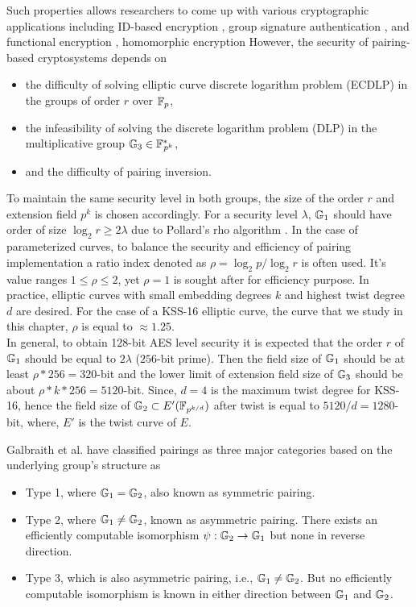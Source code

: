 Such properties allows researchers to come up with various cryptographic applications including ID-based encryption \cite{C:BonFra01}, group signature authentication \cite{C:BonBoySha04}, and functional encryption \cite{C:OkaTak10}, homomorphic encryption \cite{EC:OkaUch98a,CCS:NacSte98,PAIRING:OkaTak08} However, the security of pairing-based cryptosystems depends  on 
\begin{itemize}
	\item  the difficulty of solving elliptic curve discrete logarithm problem (ECDLP) in the groups of order $r$ over ${\mathbb{F}}_{p}$,
	\item  the infeasibility of solving the discrete logarithm problem (DLP) in the multiplicative group ${\mathbb{G}}_{3} \in {{\mathbb{F}}^{\ast}}_{\!\!\!p^{k}}$,
	\item and the difficulty of pairing inversion.
\end{itemize}
To maintain the same security level in both groups, the size of the order $r$ and extension field $p^k$ is chosen accordingly. 
For a security level $\lambda$, ${\mathbb{G}}_{1}$ should have order of size $\log_2 r \geq 2\lambda$ due to Pollard's rho algorithm \cite{1978-pollard-kangaroo}.
In the case of parameterized curves, to balance the security and efficiency of pairing implementation a ratio index denoted as $\rho = \log_2 p/ \log_2 r$ is often used.
It's value ranges $1\leq  \rho  \leq 2$, yet $\rho=1$ is sought after for efficiency purpose. 
In practice, elliptic curves with small embedding degrees $k$ and highest twist degree $d$ are desired.
For the case of a KSS-16 elliptic curve, the curve that we study in this chapter, $\rho$ is equal to  $ \approx 1.25$. \\
In general, to obtain 128-bit AES level security it is expected that the order $r$ of ${\mathbb{G}}_{1}$ should be equal to $2\lambda $ ($256$-bit prime).
Then the field size  of  ${\mathbb{G}}_{1}$ should be at least $\rho*256 = 320$-bit and the lower limit of extension field size of ${\mathbb{G}}_{3}$ should be about $\rho*k*256= 5120$-bit.
Since,  $d=4$ is the maximum twist degree for KSS-16, hence the field size of ${\mathbb{G}}_{2} \subset E'(\mathbb{F}_{p^{k/d}})$ after twist is  equal to $5120/d=1280$-bit, where, $E'$ is the twist curve of $E$.


Galbraith et al. \cite{galbraith2008pairings} have classified pairings as three major categories based on the underlying group's structure as 
\begin{itemize}
	\item Type 1, where ${\mathbb{G}}_{1} = {\mathbb{G}}_{2}$, also known as symmetric pairing. 
	\item Type 2, where ${\mathbb{G}}_{1} \neq {\mathbb{G}}_{2}$, known as asymmetric pairing. There exists an efficiently computable isomorphism $\psi : {\mathbb{G}}_{2} \to {\mathbb{G}}_{1}$ but none in reverse direction.
	\item Type 3, which is also asymmetric pairing, i.e., ${\mathbb{G}}_{1} \neq {\mathbb{G}}_{2}$. But no efficiently computable isomorphism is known in either direction  between ${\mathbb{G}}_{1}$ and ${\mathbb{G}}_{2}$.
\end{itemize}

